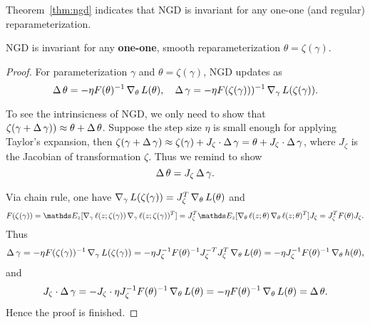 \documentclass{article}
\begin{document}
Theorem~\ref{thm:ngd} indicates that NGD is invariant for any one-one (and regular) reparameterization.
\begin{thm}\label{thm:ngd}
NGD is invariant for any \textbf{one-one}, smooth reparameterization $\theta = \zeta (\gamma)$.
\end{thm}
\begin{proof}
For parameterization $\gamma$ and $\theta=\zeta(\gamma)$, NGD updates as
\begin{equation}
    \operatorname{\Delta}\theta = -\eta F(\theta)^{-1}\operatorname{\nabla}_{\theta} L(\theta),\quad
    \operatorname{\Delta} \gamma = -\eta F(\zeta(\gamma)))^{-1}\operatorname{\nabla}_{\gamma} L(\zeta(\gamma)).
\end{equation}

To see the intrinsicness of NGD, we only need to show that
$\zeta(\gamma + \operatorname{\Delta}\gamma)) \approx \theta + \operatorname{\Delta}\theta$.
Suppose the step size $\eta$ is small enough for applying Taylor's expansion, then
$\zeta(\gamma + \operatorname{\Delta}\gamma) \approx \zeta(\gamma) + J_{\zeta} \cdot \operatorname{\Delta}\gamma = \theta + J_{\zeta} \cdot \operatorname{\Delta}\gamma$,
where $J_{\zeta}$ is the Jacobian of transformation $\zeta$.
Thus we remind to show
\begin{equation}\label{eq:intrinsic}
    \operatorname{\Delta}\theta = J_{\zeta} \operatorname{\Delta}\gamma.
\end{equation}

Via chain rule, one have $\operatorname{\nabla}_{\gamma} L(\zeta(\gamma)) = J_{\zeta}^T \operatorname{\nabla}_{\theta} L(\theta)$ and
\begin{equation}
\begin{aligned}
    F(\zeta(\gamma)) = \Ebb_z [\grad_{\gamma} \ell(z;\zeta(\gamma)) \grad_{\gamma} \ell(z;\zeta(\gamma))^T] = J_{\zeta}^T \Ebb_{z} [\grad_{\theta}\ell(z;\theta) \grad_{\theta}\ell(z;\theta)^T] J_{\zeta} = J_{\zeta}^T F(\theta) J_{\zeta}.
\end{aligned}
\end{equation}
Thus
\begin{equation}
    \operatorname{\Delta}\gamma = -\eta F(\zeta(\gamma))^{-1} \operatorname{\nabla}_{\gamma} L(\zeta(\gamma))
    = -\eta J_{\zeta}^{-1} F(\theta)^{-1}J_{\zeta}^{-T} J_{\zeta}^T \operatorname{\nabla}_{\theta} L(\theta) 
    = -\eta J_{\zeta}^{-1} F(\theta)^{-1} \operatorname{\nabla}_{\theta} h(\theta),
\end{equation}
and
\begin{equation}
    J_{\zeta} \cdot \operatorname{\Delta}\gamma 
    = - J_{\zeta} \cdot \eta J_{\zeta}^{-1} F(\theta)^{-1} \operatorname{\nabla}_{\theta} L(\theta)
    = - \eta F(\theta)^{-1} \operatorname{\nabla}_{\theta} L(\theta)
    = \operatorname{\Delta}\theta.
\end{equation}
Hence the proof is finished.
\end{proof}
\end{document}
